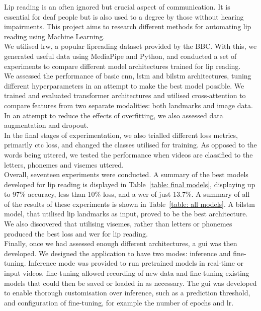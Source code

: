 %
{\singlespacing
Lip reading is an often ignored but crucial aspect of communication. It is essential for deaf people but is also used to a degree by those without hearing impairments. 
This project aims to research different methods for automating lip reading using Machine Learning.\\ 
We utilised \gls{lrw}, a popular lipreading dataset provided by the BBC. With this, we generated useful data using MediaPipe and Python, and conducted a set of experiments to compare different model architectures trained for lip reading.\\
We assessed the performance of basic \acrfull{cnn}, \acrfull{lstm} and \acrfull{bilstm} architectures, tuning different hyperparameters in an attempt to make the best model possible. We trained and evaluated \gls{transformer} architectures and utilised cross-attention to compare features from two separate modalities: both landmarks and image data. In an attempt to reduce the effects of \gls{overfitting}, we also assessed data augmentation and dropout.\\
In the final stages of experimentation, we also trialled different loss metrics, primarily \acrfull{ctc} loss, and changed the classes utilised for training. As opposed to the words being uttered, we tested the performance when videos are classified to the letters, \gls{phoneme}s and \gls{viseme}s uttered.\\
Overall, seventeen experiments were conducted. A summary of the best models developed for lip reading is displayed in Table~\ref{table: final models}, displaying up to 97\% accuracy, less than 10\% loss, and a \acrfull{wer} of just 13.7\%. A summary of all of the results of these experiments is shown in Table~\ref{table: all models}. A \acrshort{bilstm} model, that utilised lip landmarks as input, proved to be the best architecture. We also discovered that utilising \gls{viseme}s, rather than letters or \gls{phoneme}s produced the best loss and \acrshort{wer} for lip reading.\\
Finally, once we had assessed enough different architectures, a \acrfull{gui} was then developed. We designed the application to have two modes: inference and \gls{fine-tuning}. Inference mode was provided to run pretrained models in real-time or input videos. \Gls{fine-tuning} allowed recording of new data and \gls{fine-tuning} existing models that could then be saved or loaded in as necessary. The \acrshort{gui} was developed to enable thorough customisation over inference, such as a prediction threshold, and configuration of \gls{fine-tuning}, for example the number of epochs and \acrfull{lr}.
}


